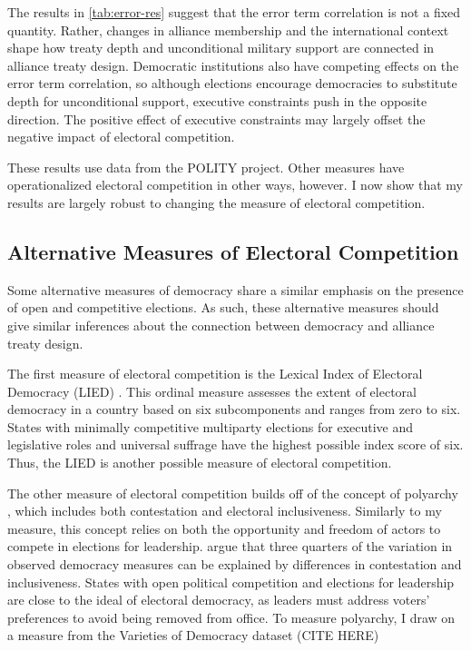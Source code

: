\documentclass[12pt]{article}
\begin{document}
The results in \autoref{tab:error-res} suggest that the error term correlation is not a fixed quantity. 
Rather, changes in alliance membership and the international context shape how treaty depth and unconditional military support are connected in alliance treaty design. 
Democratic institutions also have competing effects on the error term correlation, so although elections encourage democracies to substitute depth for unconditional support, executive constraints push in the opposite direction. 
The positive effect of executive constraints may largely offset the negative impact of electoral competition. 


These results use data from the POLITY project. 
Other measures have operationalized electoral competition in other ways, however. 
I now show that my results are largely robust to changing the measure of electoral competition. 


\subsection{Alternative Measures of Electoral Competition}


Some alternative measures of democracy share a similar emphasis on the presence of open and competitive elections. 
As such, these alternative measures should give similar inferences about the connection between democracy and alliance treaty design. 


The first measure of electoral competition is the Lexical Index of Electoral Democracy (LIED) \citep{Skaaningetal2015}. 
This ordinal measure assesses the extent of electoral democracy in a country based on six subcomponents and ranges from zero to six.  
States with minimally competitive multiparty elections for executive and legislative roles and universal suffrage have the highest possible index score of six.
Thus, the LIED is another possible measure of electoral competition. 


The other measure of electoral competition builds off of the concept of polyarchy \citep{Dahl1971}, which includes both contestation and electoral inclusiveness. 
Similarly to my measure, this concept relies on both the opportunity and freedom of actors to compete in elections for leadership. 
\citet{Coppedgeetal2008} argue that three quarters of the variation in observed democracy measures can be explained by differences in contestation and inclusiveness. 
States with open political competition and elections for leadership are close to the ideal of electoral democracy, as leaders must address voters' preferences to avoid being removed from office. 
To measure polyarchy, I draw on a measure from the Varieties of Democracy dataset (CITE HERE)%
\end{document}
